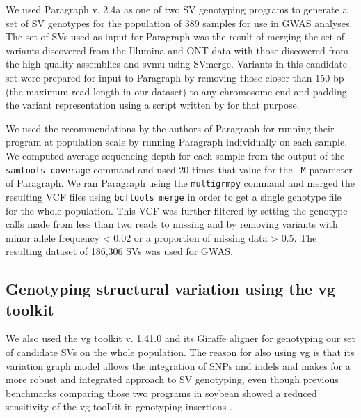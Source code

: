 \documentclass[12pt]{article}
\begin{document}
We used Paragraph v. 2.4a \citep{chen2019} as one of two SV genotyping programs
to generate a set of SV genotypes for the population of 389 samples for use in
GWAS analyses.  The set of SVs used as input for Paragraph was the result of
merging the set of variants discovered from the Illumina and ONT data with
those discovered from the high-quality assemblies and svmu using SVmerge.
Variants in this candidate set were prepared for input to Paragraph by removing
those closer than 150 bp (the maximum read length in our dataset) to any
chromosome end and padding the variant representation using a script written by
\cite{hickey2020} for that purpose.

We used the recommendations by the authors of Paragraph for running their
program at population scale by running Paragraph individually on each sample.
We computed average sequencing depth for each sample from the output of the
\texttt{samtools coverage} command and used 20 times that value for the
\texttt{-M} parameter of Paragraph.  We ran Paragraph using the
\texttt{multigrmpy} command and merged the resulting VCF files using
\texttt{bcftools merge} in order to get a  single genotype file for the whole
population. This VCF was further filtered by setting the genotype calls made
from less than two reads to missing and by removing variants with minor allele
frequency < 0.02 or a proportion of missing data > 0.5. The resulting dataset
of 186,306 SVs was used for GWAS.

\subsection{Genotyping structural variation using the vg toolkit}
\label{sv-gwas-sv-genotyping-vg}

We also used the vg toolkit v. 1.41.0 \citep{hickey2020} and its Giraffe
aligner \citep{siren2021} for genotyping our set of candidate SVs on the whole
population. The reason for also using vg is that its variation graph model allows
the integration of SNPs and indels and makes for a more robust and integrated
approach to SV genotyping, even though previous benchmarks comparing those two
programs in soybean showed a reduced sensitivity of the vg toolkit in
genotyping insertions \citep{lemay2022}.
\end{document}
